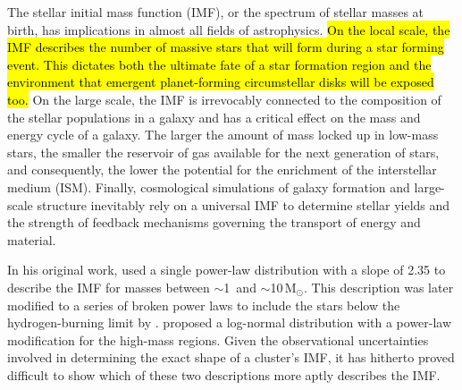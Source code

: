 \documentclass{aa}
\newcommand{\msune}{M$_\odot$}
\newcommand{\s}{$\sim$}
\begin{document}
The stellar initial mass function (IMF), or the spectrum of stellar masses at birth, has implications in almost all fields of astrophysics.
\hl{On the local scale, the IMF describes the number of massive stars that will form during a star forming event.
This dictates both the ultimate fate of a star formation region and the environment that emergent planet-forming circumstellar disks will be exposed too.}
On the large scale, the IMF is irrevocably connected to the composition of the stellar populations in a galaxy and has a critical effect on the mass and energy cycle of a galaxy.
The larger the amount of mass locked up in low-mass stars, the smaller the reservoir of gas available for the next generation of stars, and consequently, the lower the potential for the enrichment of the interstellar medium (ISM).
Finally, cosmological simulations of galaxy formation and large-scale structure inevitably rely on a universal IMF to determine stellar yields and the strength of feedback mechanisms governing the transport of energy and material.

In his original work, \citet{salpeter1955} used a single power-law distribution with a slope of 2.35 to describe the IMF for masses between \s1\ and \s10\,\msune.
This description was later modified to a series of broken power laws to include the stars below the hydrogen-burning limit by \citet{kroupa2001}\@.
\citet{chabrier2003, Chabrier2005} proposed a log-normal distribution with a power-law modification for the high-mass regions.
Given the observational uncertainties involved in determining the exact shape of a cluster's IMF, it has hitherto proved difficult to show which of these two descriptions more aptly describes the IMF\@.
\end{document}
